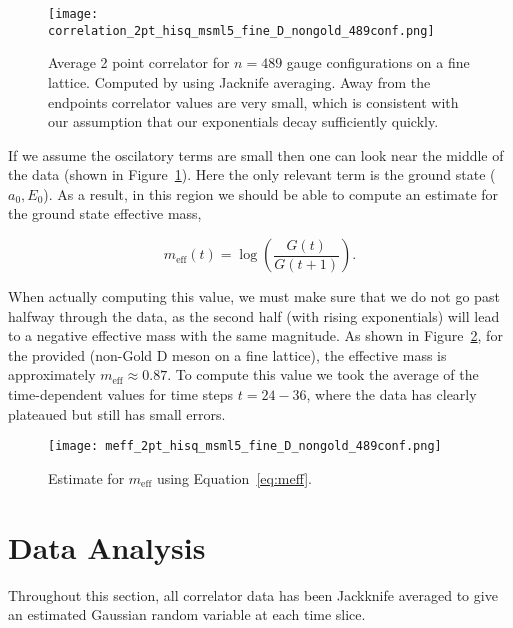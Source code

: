 \documentclass[a4paper,12pt]{article}
\begin{document}
\begin{figure}
    \centering
    \texttt{[image: correlation\_2pt\_hisq\_msml5\_fine\_D\_nongold\_489conf.png]}
    \caption{Average 2 point correlator for $n=489$ gauge configurations on a fine lattice. Computed by using Jacknife averaging. Away from the endpoints correlator values are very small, which is consistent with our assumption that our exponentials decay sufficiently quickly.\label{fig:2ptCorrelator}}
\end{figure}

If we assume the oscilatory terms are small then one can look near the middle of the data (shown in Figure~\ref{fig:2ptCorrelator}). Here the only relevant term is the ground state ($a_0, E_0$). As a result, in this region we should be able to compute an estimate for the ground state effective mass, 

\begin{equation}
    \label{eq:meff}
    m_{\text{eff}}(t) = \log(\frac{G(t)}{G(t+1)}).
\end{equation}

When actually computing this value, we must make sure that we do not go past halfway through the data, as the second half (with rising exponentials) will lead to a negative effective mass with the same magnitude. As shown in Figure~\ref{fig:2ptCorrelatorMeff}, for the provided (non-Gold D meson on a fine lattice), the effective mass is approximately $m_\text{eff} \approx 0.87$. To compute this value we took the average of the time-dependent values for time steps $t = 24 - 36$, where the data has clearly plateaued but still has small errors.

\begin{figure}
    \centering
    \texttt{[image: meff\_2pt\_hisq\_msml5\_fine\_D\_nongold\_489conf.png]}
    \caption{Estimate for $m_\text{eff}$ using Equation~\ref{eq:meff}.\label{fig:2ptCorrelatorMeff}} 
\end{figure}

\clearpage
\section{Data Analysis}
Throughout this section, all correlator data has been Jackknife averaged to give an estimated Gaussian random variable at each time slice.

\printbibliography{}
\end{document}

